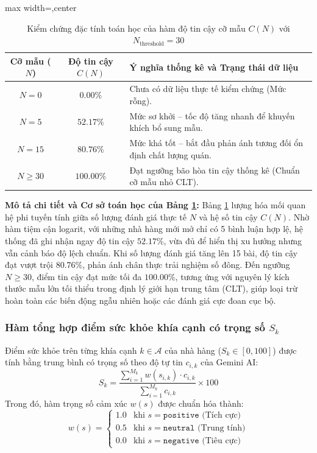\documentclass[12pt, a4paper]{article}
\begin{document}
\begin{table}[!htbp]
\centering
\caption{Kiểm chứng đặc tính toán học của hàm độ tin cậy cỡ mẫu $C(N)$ với $N_{\text{threshold}} = 30$}
\label{tab:cn_table}
\vspace{0.15cm}
\footnotesize
\renewcommand{\arraystretch}{1.15}
\begin{adjustbox}{max width=\textwidth,center}
\begin{tabular}{c c l}
\toprule
\rowcolor{blue!8}
\textbf{Cỡ mẫu ($N$)} & \textbf{Độ tin cậy $C(N)$} & \textbf{Ý nghĩa thống kê và Trạng thái dữ liệu} \\
\midrule
$N = 0$  & $0.00\%$  & Chưa có dữ liệu thực tế kiểm chứng (Mức rỗng). \\
$N = 5$  & $52.17\%$ & Mức sơ khởi -- tốc độ tăng nhanh để khuyến khích bổ sung mẫu. \\
$N = 15$ & $80.76\%$ & Mức khá tốt -- bắt đầu phản ánh tương đối ổn định chất lượng quán. \\
$N \ge 30$ & $100.00\%$ & Đạt ngưỡng bão hòa tin cậy thống kê (Chuẩn cỡ mẫu nhỏ CLT). \\
\bottomrule
\end{tabular}
\end{adjustbox}
\end{table}

\textbf{Mô tả chi tiết và Cơ sở toán học của Bảng \ref{tab:cn_table}:} Bảng \ref{tab:cn_table} lượng hóa mối quan hệ phi tuyến tính giữa số lượng đánh giá thực tế $N$ và hệ số tin cậy $C(N)$. Nhờ hàm tiệm cận logarit, với những nhà hàng mới mở chỉ có 5 bình luận hợp lệ, hệ thống đã ghi nhận ngay độ tin cậy $52.17\%$, vừa đủ để hiển thị xu hướng nhưng vẫn cảnh báo độ lệch chuẩn. Khi số lượng đánh giá tăng lên 15 bài, độ tin cậy đạt vượt trội $80.76\%$, phản ánh chân thực trải nghiệm số đông. Đến ngưỡng $N \ge 30$, điểm tin cậy đạt mức tối đa $100.00\%$, tương ứng với nguyên lý kích thước mẫu lớn tối thiểu trong định lý giới hạn trung tâm (CLT), giúp loại trừ hoàn toàn các biến động ngẫu nhiên hoặc các đánh giá cực đoan cục bộ.

\subsubsection{Hàm tổng hợp điểm sức khỏe khía cạnh có trọng số $S_k$}
Điểm sức khỏe trên từng khía cạnh $k \in \mathcal{A}$ của nhà hàng ($S_k \in [0, 100]$) được tính bằng trung bình có trọng số theo độ tự tin $c_{i,k}$ của Gemini AI:
\begin{equation}
    S_k = \frac{\sum_{i=1}^{M_k} w(s_{i,k}) \cdot c_{i,k}}{\sum_{i=1}^{M_k} c_{i,k}} \times 100
\end{equation}
Trong đó, hàm trọng số cảm xúc $w(s)$ được chuẩn hóa thành:
\begin{equation}
    w(s) = \begin{cases} 
        1.0 & \text{khi } s = \texttt{positive} \text{ (Tích cực)} \\ 
        0.5 & \text{khi } s = \texttt{neutral} \text{ (Trung tính)} \\ 
        0.0 & \text{khi } s = \texttt{negative} \text{ (Tiêu cực)} 
    \end{cases}
\end{equation}
\end{document}
